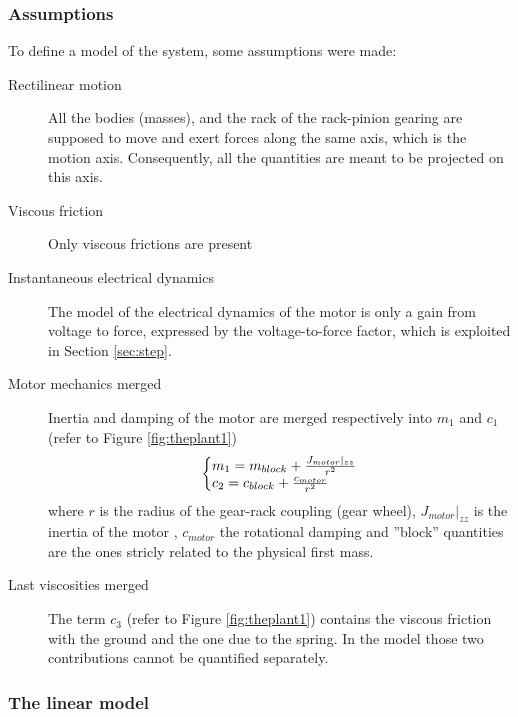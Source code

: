 \documentclass[twosided,a4paper]{article}           %
\makeatletter
\newenvironment{sistema}%
{\left\lbrace\begin{array}{@{}l@{}}}%
	{\end{array}\right.}
\makeatother
\begin{document}
\subsubsection{Assumptions}
\label{sec:ass}
To define a model of the system, some assumptions were made:
\begin{description}
	\item[Rectilinear motion] All the bodies (masses), and the rack of the rack-pinion gearing are supposed to move and exert forces along the same axis, which is the motion axis. Consequently, all the quantities are meant to be projected on this axis.
	\item[Viscous friction] Only viscous frictions are present
	\item[Instantaneous electrical dynamics] The model of the electrical dynamics of the motor is only a gain from voltage to force, expressed by the voltage-to-force factor, which is exploited in Section \ref{sec:step}.
	\item [Motor mechanics merged] Inertia and damping of the motor are merged respectively into $m_1$ and $c_1$ (refer to Figure \ref{fig:theplant1})
	\begin{equation}
	\begin{sistema}
	m_1 = m_{block} + \frac{J_{motor}\vert_{zz}}{r^2}\\
	c_2 = c_{block} + \frac{c_{motor}}{r^2}
	\end{sistema}
	\end{equation}
	where $r$ is the radius of the gear-rack coupling (gear wheel), $J_{motor}\vert_{zz}$ is the inertia of the motor , $c_{motor}$ the rotational damping and ''block'' quantities are the ones stricly related to the physical first mass.
	\item [Last viscosities merged] The term $c_3$ (refer to Figure \ref{fig:theplant1}) contains the viscous friction with the ground and the one due to the spring. In the model those two contributions cannot be quantified separately.
\end{description}
\subsubsection{The linear model}
\label{sec:linear_sys}
\end{document}
